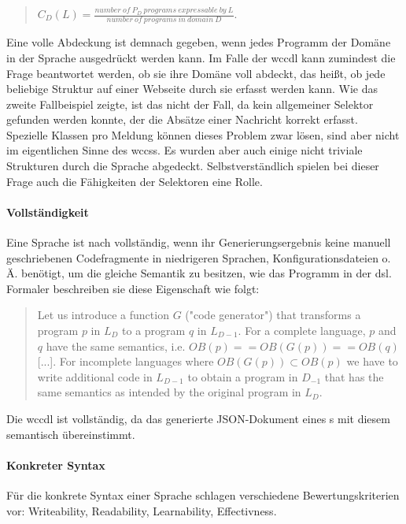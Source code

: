     \begin{quote}
        $C_D(L) = \frac{number\ of\ P_D\ programs\ expressable\ by\ L}{number\ of\ programs\ in\ domain\ D}$.
    \end{quote}

    Eine volle Abdeckung ist demnach gegeben,
    wenn jedes Programm der Domäne in der Sprache ausgedrückt werden kann.
    Im Falle der \gls{wccdl} kann zumindest die Frage beantwortet werden,
    ob sie ihre Domäne voll abdeckt, das heißt, ob jede beliebige Struktur auf einer Webseite
    durch sie erfasst werden kann.
    Wie das zweite Fallbeispiel zeigte, ist das nicht der Fall,
    da kein allgemeiner Selektor gefunden werden konnte,
    der die Absätze einer Nachricht korrekt erfasst.
    Spezielle Klassen pro Meldung können dieses Problem zwar lösen,
    sind aber nicht im eigentlichen Sinne des \glspl{wccs}.
    Es wurden aber auch einige nicht triviale Strukturen durch die Sprache abgedeckt.
    Selbstverständlich spielen bei dieser Frage auch die Fähigkeiten der Selektoren
    eine Rolle.

    \paragraph{Vollständigkeit}
    Eine Sprache ist nach \citet[Kapitel 4.5]{voelter:DslEngineering}
    vollständig, wenn ihr Generierungsergebnis keine manuell geschriebenen Codefragmente in niedrigeren Sprachen,
    Konfigurationsdateien o. Ä. benötigt,
    um die gleiche Semantik zu besitzen, wie das Programm in der \gls{dsl}.
    Formaler beschreiben sie diese Eigenschaft wie folgt:

    \begin{quote}
        Let us introduce a function $G$ ("code generator") that transforms
        a program $p$ in $L_D$ to a program $q$ in $L_{D-1}$.
        For a complete language, $p$ and $q$ have the same semantics, i.e.
        $OB(p) == OB(G(p)) == OB(q)$ [...]. For incomplete languages
        where $OB(G(p)) \subset OB(p)$ we have to write additional
        code in $L_{D-1}$ to obtain a program in $D_{-1}$ that has the same semantics
        as intended by the original program in $L_D$.
    \end{quote}

    Die \gls{wccdl} ist vollständig, da das generierte JSON-Dokument eines
    {\classificationModel}s mit diesem semantisch übereinstimmt.

    \paragraph{Konkreter Syntax}
    Für die konkrete Syntax einer Sprache schlagen \citet[Kapitel 4.7]{voelter:DslEngineering}
    verschiedene Bewertungskriterien vor: Writeability, Readability, Learnability, Effectivness.

